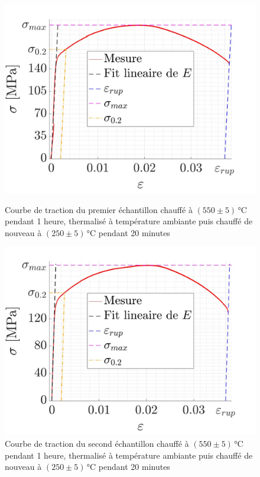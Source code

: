 \documentclass[a4paper, 12pt,oneside]{article}
\begin{document}
\begin{figure}[H]
    \centering
    \begin{minipage}{0.45\textwidth}
        \centering
        \includegraphics[width=\linewidth]{GRAPHES/Graphe_6.jpg}
        \captionsetup{justification=centering}
        \caption{Courbe de traction du premier échantillon chauffé à $(550 \pm 5)$\,°C pendant 1 heure, thermalisé à température ambiante puis chauffé de nouveau à $(250 \pm 5)$\,°C pendant 20 minutes}
        \label{fig7}
    \end{minipage}
    \hfill
    \begin{minipage}{0.45\textwidth}
        \centering
        \includegraphics[width=\linewidth]{GRAPHES/Graphe_5.jpg}
        \captionsetup{justification=centering}
        \caption{Courbe de traction du second échantillon chauffé à $(550 \pm 5)$\,°C pendant 1 heure, thermalisé à température ambiante puis chauffé de nouveau à $(250 \pm 5)$\,°C pendant 20 minutes}
        \label{fig8}
    \end{minipage}
\end{figure}
\end{document}
